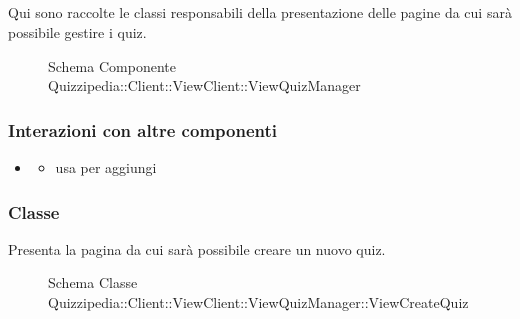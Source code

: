 \subsection{}
Qui sono raccolte le classi responsabili della presentazione delle pagine da cui sarà possibile gestire i quiz.
\begin{figure}[H]
\centering
\noindent{}
\caption[Schema Componente Quizzipedia::Client::ViewClient::ViewQuizManager]{Schema Componente Quizzipedia::Client::ViewClient::ViewQuizManager}
\end{figure}
\subsubsection{Interazioni con altre componenti}
\begin{itemize}
\item {}
\begin{itemize}
\item usa  per aggiungi
\end{itemize}
\end{itemize}
\subsubsection{Classe }
Presenta la pagina da cui sarà possibile creare un nuovo quiz.
\begin{figure}[H]
\centering
\noindent{}
\caption[Schema Classe ViewCreateQuiz]{Schema Classe Quizzipedia::Client::ViewClient::ViewQuizManager::ViewCreateQuiz}
\end{figure}
